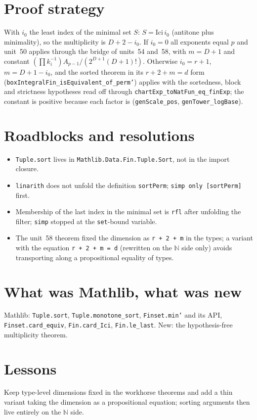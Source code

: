 \documentclass[11pt]{article}
\begin{document}
\section{Proof strategy}
With $i_0$ the least index of the minimal set $S$: $S=\mathrm{Ici}\,i_0$ (antitone plus minimality),
so the multiplicity is $D+2-i_0$. If $i_0=0$ all exponents equal $p$ and unit~50 applies through the
bridge of units~54 and~58, with $m=D+1$ and constant $(\prod k_i^{-1})A_{p-1}/(2^{D+1}(D+1)!)$.
Otherwise $i_0=r+1$, $m=D+1-i_0$, and the sorted theorem in its $r+2+m=d$ form
(\texttt{boxIntegralFin\_isEquivalent\_of\_perm'}) applies with the sortedness, block and strictness
hypotheses read off through \texttt{chartExp\_toNatFun\_eq\_finExp}; the constant is positive because
each factor is (\texttt{genScale\_pos}, \texttt{genTower\_logBase}).

\section{Roadblocks and resolutions}
\begin{itemize}
\item \texttt{Tuple.sort} lives in \texttt{Mathlib.Data.Fin.Tuple.Sort}, not in the import closure.
\item \texttt{linarith} does not unfold the definition \texttt{sortPerm}; \texttt{simp only [sortPerm]}
first.
\item Membership of the last index in the minimal set is \texttt{rfl} after unfolding the filter;
\texttt{simp} stopped at the \texttt{set}-bound variable.
\item The unit~58 theorem fixed the dimension as \texttt{r + 2 + m} in the types; a variant with the
equation \texttt{r + 2 + m = d} (rewritten on the $\mathbb N$ side only) avoids transporting along a
propositional equality of types.
\end{itemize}

\section{What was Mathlib, what was new}
Mathlib: \texttt{Tuple.sort}, \texttt{Tuple.monotone\_sort}, \texttt{Finset.min'} and its API,
\texttt{Finset.card\_equiv}, \texttt{Fin.card\_Ici}, \texttt{Fin.le\_last}. New: the hypothesis-free
multiplicity theorem.

\section{Lessons}
Keep type-level dimensions fixed in the workhorse theorems and add a thin variant taking the dimension
as a propositional equation; sorting arguments then live entirely on the $\mathbb N$ side.
\end{document}
